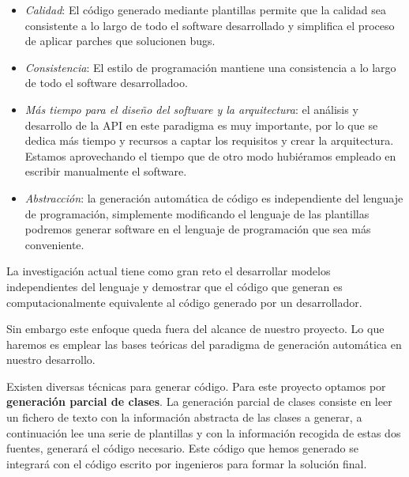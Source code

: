 \begin{itemize}
	\item \textit{Calidad}: El código generado mediante plantillas permite que la calidad sea consistente a lo largo de todo 	el software desarrollado y simplifica el proceso de aplicar parches que solucionen bugs. 
	\item \textit{Consistencia}: El estilo de programación mantiene una consistencia a lo largo de todo el software desarrolladoo.
	\item \textit{Más tiempo para el diseño del software y la arquitectura}: el análisis y desarrollo de la API en este paradigma es muy importante, por lo que se dedica más tiempo y recursos a captar los requisitos y crear la arquitectura. Estamos aprovechando el tiempo que de otro modo hubiéramos empleado en escribir manualmente el software.
	\item \textit{Abstracción}: la generación automática de código es independiente del lenguaje de programación, simplemente modificando el lenguaje de las plantillas podremos generar software en el lenguaje de programación que sea más conveniente. 
\end{itemize}
\medskip\par

La investigación actual tiene como gran reto el desarrollar modelos independientes del lenguaje y demostrar que el código que generan es computacionalmente equivalente al código generado por un desarrollador.\par
Sin embargo este enfoque queda fuera del alcance de nuestro proyecto. Lo que haremos es emplear las bases teóricas del paradigma de generación automática en nuestro desarrollo.\medskip\par
Existen diversas técnicas para generar código. Para este proyecto optamos por \textbf{generación parcial de clases}. La generación parcial de clases consiste en leer un fichero de texto con la información abstracta de las clases a generar, a continuación lee una serie de plantillas y con la información recogida de estas dos fuentes, generará el código necesario. Este código que hemos generado se integrará con el código escrito por ingenieros para formar la solución final.\par


